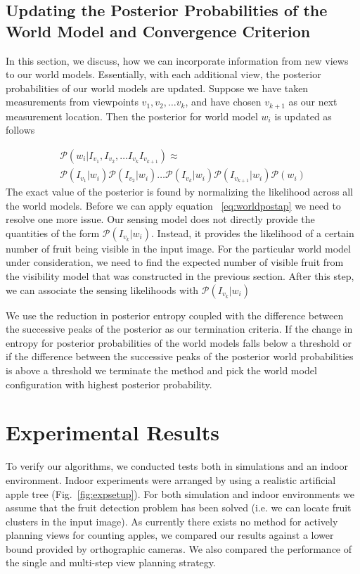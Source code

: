 \subsection{Updating the Posterior Probabilities of the World Model and Convergence Criterion} \label{sec:probupdate}

In this section, we discuss, how we can incorporate information from new views to our world models. Essentially, with each additional view, the posterior probabilities of our world models are updated. Suppose we have taken measurements from viewpoints $v_1,v_2,\ldots v_k$, and have chosen $v_{k+1}$ as our next measurement location. Then the posterior for world model $w_i$ is updated as follows

\begin{equation}
\begin{split}
\mathcal{P}\left(w_i|I_{v_1},I_{v_2}, \ldots I_{v_k} I_{v_{k+1}}\right) \approx \\ \mathcal{P}\left(I_{v_1}|w_i\right) \mathcal{P}\left(I_{v_2}|w_i\right) \ldots \mathcal{P}\left(I_{v_k}|w_i\right)\mathcal{P}\left(I_{v_{k+1}}|w_i\right) \mathcal{P}\left(w_i\right)
\end{split}
\label{eq:worldpostap}
\end{equation}
The exact value of the posterior is found by normalizing the likelihood across all the world models. Before we can apply equation ~\eqref{eq:worldpostap} we need to resolve one more issue. Our sensing model does not directly provide the quantities of the form $\mathcal{P}\left(I_{v_{k}}|w_i\right)$. Instead, it provides the likelihood of a certain number of fruit being visible in the input image. For the particular world model under consideration, we need to find the expected number of visible fruit from the visibility model that was constructed in the previous section. After this step, we can associate the sensing likelihoods with $\mathcal{P}\left(I_{v_{k}}|w_i\right)$



We use the reduction in posterior entropy coupled with the difference between the successive peaks of the posterior as our termination criteria. If the change in entropy for posterior probabilities of the world models falls below a threshold or if the difference between the successive peaks of the posterior world probabilities is above a threshold we terminate the method and pick the world model configuration with highest posterior probability. 


\section{Experimental Results}
To verify our algorithms, we conducted tests both in simulations and an indoor environment.  Indoor experiments were arranged by using a realistic artificial apple tree (Fig.~\ref{fig:expsetup}). For both simulation and indoor environments we assume that the fruit detection problem has been solved (i.e. we can locate fruit clusters in the input image). As currently there exists no method for actively planning views for counting apples, we compared our results against a lower bound provided by orthographic cameras. We also compared the performance of the single and multi-step view planning strategy.
